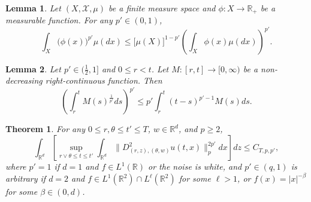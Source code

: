 \documentclass[10pt,a4paper]{amsart}
\newtheorem{lemma}{Lemma}
\newtheorem{theorem}{Theorem}
\def\bR{\mathbb{R}}
\begin{document}
\begin{lemma}
\label{Hol-lem}
Let $(X,\mathcal{X},\mu)$ be a finite measure space and $\phi:X \to \bR_{+}$ be a measurable function. For any $p' \in (0,1)$,
\[
\int_{X} \big(\phi(x)\big)^{p'} \mu(dx) \leq \big[\mu(X)\big]^{1-p'} \left( \int_{X} \phi(x) \mu(dx)\right)^{p'}.
\]
\end{lemma}

\begin{lemma} \label{incr ineq}
Let $p' \in (\frac12,1]$ and $0 \leq r<t$. Let $M:[r,t] \to [0,\infty)$ be a non-decreasing right-continuous function. Then
\[
 \left( \int_r^t M(s)^{\frac{1}{p'}} ds \right)^{p'} \leq p' \int_r^t (t-s)^{p'-1} M(s) ds.
\]
\end{lemma}

\begin{theorem}
\label{key-D2u-int}
For any $0\leq r,\theta \leq t' \leq T$, $w \in \bR^d$,  and $p\geq 2$,
\[
\int_{\bR^d} \left[ \sup_{r \vee \theta \leq t \leq t'} \int_{\bR^d} \|D_{(r,z),(\theta,w)}^2u(t,x)\|^{2p'}_p dx \right] dz \leq C_{T,p,p'},
\]
where $p'=1$ if $d=1$ and $f \in L^1(\bR)$ or the noise is white, and  $p' \in (q,1)$ is arbitrary if $d=2$ and $f \in L^1(\bR^2) \cap L^{\ell}(\bR^2)$ for some $\ell>1$, or $f(x)=|x|^{-\beta}$ for some $\beta \in (0,d)$.

\end{theorem}
\end{document}
